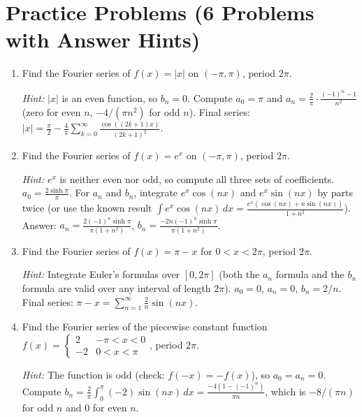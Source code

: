 \documentclass[12pt,a4paper]{article}
\begin{document}
\section{Practice Problems (6 Problems with Answer Hints)}

\begin{enumerate}[label=\textbf{P\arabic*.}]

\item Find the Fourier series of $f(x) = |x|$ on $(-\pi, \pi)$, period $2\pi$.

\textit{Hint:} $|x|$ is an even function, so $b_n = 0$. Compute $a_0 = \pi$ and $a_n = \frac{2}{\pi}\cdot\frac{(-1)^n - 1}{n^2}$ (zero for even $n$, $-4/(\pi n^2)$ for odd $n$). Final series: $|x| = \frac{\pi}{2} - \frac{4}{\pi}\sum_{k=0}^{\infty}\frac{\cos((2k+1)x)}{(2k+1)^2}$.

\item Find the Fourier series of $f(x) = e^x$ on $(-\pi, \pi)$, period $2\pi$.

\textit{Hint:} $e^x$ is neither even nor odd, so compute all three sets of coefficients. $a_0 = \frac{2\sinh\pi}{\pi}$. For $a_n$ and $b_n$, integrate $e^x\cos(nx)$ and $e^x\sin(nx)$ by parts twice (or use the known result $\int e^x\cos(nx)\,dx = \frac{e^x(\cos(nx)+n\sin(nx))}{1+n^2}$). Answer: $a_n = \frac{2(-1)^n\sinh\pi}{\pi(1+n^2)}$, $b_n = \frac{-2n(-1)^n\sinh\pi}{\pi(1+n^2)}$.

\item Find the Fourier series of $f(x) = \pi - x$ for $0 < x < 2\pi$, period $2\pi$.

\textit{Hint:} Integrate Euler's formulas over $[0, 2\pi]$ (both the $a_n$ formula and the $b_n$ formula are valid over any interval of length $2\pi$). $a_0 = 0$, $a_n = 0$, $b_n = 2/n$. Final series: $\pi - x = \sum_{n=1}^{\infty}\frac{2}{n}\sin(nx)$.

\item Find the Fourier series of the piecewise constant function
$f(x) = \begin{cases}2 & -\pi < x < 0 \\ -2 & 0 < x < \pi\end{cases}$, period $2\pi$.

\textit{Hint:} The function is odd (check: $f(-x) = -f(x)$), so $a_0 = a_n = 0$. Compute $b_n = \frac{2}{\pi}\int_0^{\pi}(-2)\sin(nx)\,dx = \frac{-4(1-(-1)^n)}{\pi n}$, which is $-8/(\pi n)$ for odd $n$ and $0$ for even $n$.


\end{enumerate}
\end{document}
